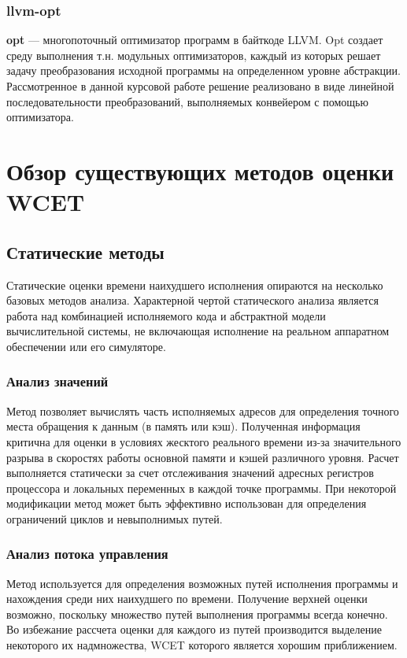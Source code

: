 \documentclass[12pt,a4paper]{article}
\begin{document}
\subsubsection{llvm-opt}

\textbf{opt} --- многопоточный оптимизатор программ в байткоде LLVM. Opt создает среду выполнения т.н. модульных оптимизаторов, каждый из которых решает задачу преобразования исходной программы на определенном уровне абстракции. Рассмотренное в данной курсовой работе решение реализовано в виде линейной последовательности преобразований, выполняемых конвейером с помощью оптимизатора.

\newpage
\section{Обзор существующих методов оценки WCET}

\subsection{Статические методы}
Статические оценки времени наихудшего исполнения опираются на несколько базовых методов анализа. Характерной чертой статического анализа является работа над комбинацией исполняемого кода и абстрактной модели вычислительной системы, не включающая исполнение на реальном аппаратном обеспечении или его симуляторе.

\subsubsection{Анализ значений}
Метод позволяет вычислять часть исполняемых адресов для определения точного места обращения к данным (в память или кэш). Полученная информация критична для оценки в условиях жесктого реального времени из-за значительного разрыва в скоростях работы основной памяти и кэшей различного уровня. Расчет выполняется статически за счет отслеживания значений адресных регистров процессора и локальных переменных в каждой точке программы. При некоторой модификации метод может быть эффективно использован для определения ограничений циклов и невыполнимых путей.

\subsubsection{Анализ потока управления}
Метод используется для определения возможных путей исполнения программы и нахождения среди них наихудшего по времени. Получение верхней оценки возможно, поскольку множество путей выполнения программы всегда конечно. Во избежание рассчета оценки для каждого из путей производится выделение некоторого их надмножества, WCET которого является хорошим приближением.
\end{document}
